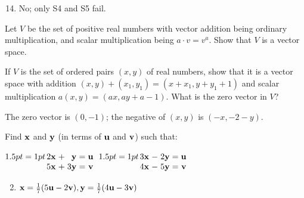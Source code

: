 \begin{multicols}{2}
\begin{ex}
\begin{sol}
\begin{enumerate}[label={\alph*.}]
\setcounter{enumi}{13}
\item  No; only S4 and S5 fail.

\end{enumerate}
\end{sol}
\end{ex}

\begin{ex}\label{ex:ex6_1_3}
Let $V$ be the set of positive real numbers with vector addition being ordinary multiplication, and scalar multiplication being $a \cdot v = v^{a}$. Show that $V$ is a vector space.
\end{ex}

\begin{ex}\label{ex:ex6_1_4}
If $V$ is the set of ordered pairs $(x, y)$ of real numbers, show that it is a vector space with addition $(x, y) + (x_{1}, y_{1}) = (x + x_{1}, y + y_{1} + 1)$ and scalar multiplication $a(x, y) = (ax, ay + a - 1)$. What is the zero vector in $V$?

\begin{sol}
The zero vector is $(0, -1)$; the negative of $(x, y)$ is $(-x, -2 - y)$.
\end{sol}
\end{ex}

\begin{ex}
Find $\textbf{x}$ and $\textbf{y}$ (in terms of $\textbf{u}$ and $\textbf{v}$) such that:
\begin{exenumerate}
\exitem $\arraycolsep=1pt
\begin{array}[t]{rlrcr}
	2\vect{x} & + & \vect{y} & = & \vect{u}	\\
	5\vect{x} & + & 3\vect{y} & = & \vect{v} \\
\end{array}$
\exitem $\arraycolsep=1pt
\begin{array}[t]{rlrcr}
	3\vect{x} & - & 2\vect{y} & = & \vect{u} \\
	4\vect{x} & - & 5\vect{y} & = & \vect{v} \\
\end{array}$
\end{exenumerate}
\begin{sol}
\begin{enumerate}[label={\alph*.}]
\setcounter{enumi}{1}
\item $\textbf{x} = \tfrac{1}{7}(5\textbf{u} - 2\textbf{v}), \textbf{y} = \tfrac{1}{7}(4\textbf{u} - 3\textbf{v})$

\end{enumerate}
\end{sol}
\end{ex}


\end{multicols}

